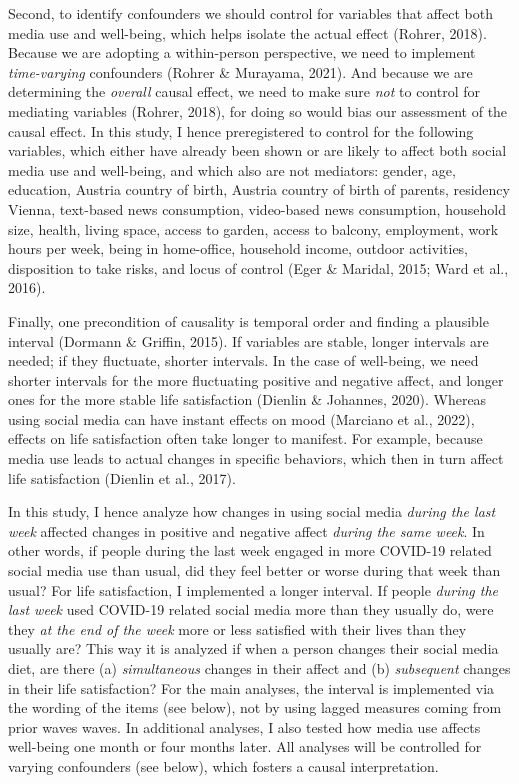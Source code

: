 \documentclass[
  man,mask,floatsintext]{apa7}
\begin{document}
Second, to identify confounders we should control for variables that affect both media use and well-being, which helps isolate the actual effect (Rohrer, 2018).
Because we are adopting a within-person perspective, we need to implement \emph{time-varying} confounders (Rohrer \& Murayama, 2021).
And because we are determining the \emph{overall} causal effect, we need to make sure \emph{not} to control for mediating variables (Rohrer, 2018), for doing so would bias our assessment of the causal effect.
In this study, I hence preregistered to control for the following variables, which either have already been shown or are likely to affect both social media use and well-being, and which also are not mediators:
gender, age, education, Austria country of birth, Austria country of birth of parents, residency Vienna, text-based news consumption, video-based news consumption, household size, health, living space, access to garden, access to balcony, employment, work hours per week, being in home-office, household income, outdoor activities, disposition to take risks, and locus of control (Eger \& Maridal, 2015; Ward et al., 2016).

Finally, one precondition of causality is temporal order and finding a plausible interval (Dormann \& Griffin, 2015).
If variables are stable, longer intervals are needed; if they fluctuate, shorter intervals.
In the case of well-being, we need shorter intervals for the more fluctuating positive and negative affect, and longer ones for the more stable life satisfaction (Dienlin \& Johannes, 2020).
Whereas using social media can have instant effects on mood (Marciano et al., 2022), effects on life satisfaction often take longer to manifest.
For example, because media use leads to actual changes in specific behaviors, which then in turn affect life satisfaction (Dienlin et al., 2017).

In this study, I hence analyze how changes in using social media \emph{during the last week} affected changes in positive and negative affect \emph{during the same week}.
In other words, if people during the last week engaged in more COVID-19 related social media use than usual, did they feel better or worse during that week than usual?
For life satisfaction, I implemented a longer interval.
If people \emph{during the last week} used COVID-19 related social media more than they usually do, were they \emph{at the end of the week} more or less satisfied with their lives than they usually are?
This way it is analyzed if when a person changes their social media diet, are there (a) \emph{simultaneous} changes in their affect and (b) \emph{subsequent} changes in their life satisfaction?
For the main analyses, the interval is implemented via the wording of the items (see below), not by using lagged measures coming from prior waves waves.
In additional analyses, I also tested how media use affects well-being one month or four months later.
All analyses will be controlled for varying confounders (see below), which fosters a causal interpretation.
\end{document}
